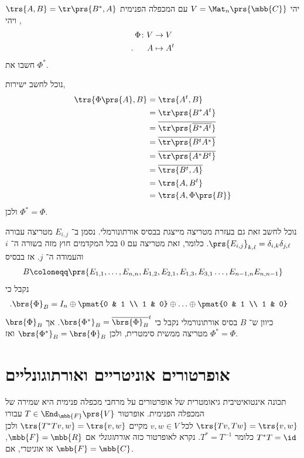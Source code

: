 \documentclass[a4paper,10pt,twoside,openany]{book}
\begin{document}
\begin{exercisechap}
יהי
$V = \Mat_n\prs{\mbb{C}}$
עם המכפלה הפנימית
$\trs{A,B} = \tr\prs{B^*, A}$,
ויהי
\begin{align*}
    \Phi \colon V &\to V \\
    \text{.} \hphantom{lala} A &\mapsto A^t
\end{align*}
חשבו את
$\Phi^*$.
\end{exercisechap}

\begin{solution}
נוכל לחשב ישירות,
\begin{align*}
    \trs{\Phi\prs{A},B} &= \trs{A^t, B} \\&= \tr\prs{B^* A^t} \\&= \overline{\tr\prs{\overline{B^* A^t}}} \\&= \overline{\tr\prs{B^t A^*}} \\&= \overline{\tr\prs{A^* B^t}} \\&= \overline{\trs{B^t, A}} \\&= \trs{A, B^t} \\&= \trs{A, \Phi\prs{B}}
\end{align*}
ולכן
$\Phi^* = \Phi$.

נוכל לחשב זאת גם בעזרת מטריצה מייצגת בבסיס אורתונורמלי.
נסמן ב־%
$E_{i,j}$
מטריצה עבורה
$\prs{E_{i,j}}_{k,\ell} = \delta_{i,k} \delta_{j,\ell}$.
כלומר, זאת מטריצה עם
$0$
בכל המקדמים חוץ מזה בשורה ה־%
$i$
והעמודה ה־%
$j$.
אז בבסיס
\[B \coloneqq \prs{E_{1,1}, \ldots, E_{n,n}, E_{1,2}, E_{2,1}, E_{1,3}, E_{3,1} \ldots, E_{n-1, n} E_{n,n-1}}\]
נקבל כי
\begin{align*}
    \text{.} \brs{\Phi}_B &= I_n \oplus \pmat{0 & 1 \\ 1 & 0} \oplus \ldots \oplus \pmat{0 & 1 \\ 1 & 0}
\end{align*}
כיוון ש־%
$B$
בסיס אורתונורמלי
נקבל כי
$\brs{\Phi^*}_B = \overline{\brs{\Phi}_B}^t$.
אך
$\brs{\Phi}_B$
מטריצה ממשית סימטרית, ולכן
$\brs{\Phi^*}_B = \brs{\Phi}_B$
ואז
$\Phi^* = \Phi$.
\end{solution}

\section{אופרטורים אוניטריים ואורתוגונליים}

תכונה אינטואיטיבית גיאומטרית של אופרטורים על מרחבי מכפלה פנימית היא שמירה של המכפלה הפנימית.
אופרטור
$T \in \End_{\mbb{F}}\prs{V}$
עבורו
$\trs{Tv, Tw} = \trs{v,w}$
לכל
$v,w \in V$
מקיים
$\trs{T^* T v, w} = \trs{v,w}$
ולכן
$T^* T = \id$
כלומר
$T^* = T^{-1}$.
נקרא לאופרטור כזה
\emph{אורתוגונלי}
אם
$\mbb{F} = \mbb{R}$,
או
\emph{אוניטרי},
אם
$\mbb{F} = \mbb{C}$.
\end{document}
